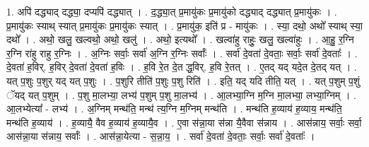 \documentclass[17pt]{extarticle}
\begin{document}
1. अपि॑ दद्ध्याद् दद्ध्या॒ दप्यपि॑ दद्ध्यात् । . द॒द्ध्या॒त् प्र॒मायु॑कः प्र॒मायु॑को दद्ध्याद् दद्ध्यात् प्र॒मायु॑कः । . प्र॒मायु॑कः स्याथ् स्यात् प्र॒मायु॑कः प्र॒मायु॑कः स्यात् । . प्र॒मायु॑क॒ इति॑ प्र - मायु॑कः । . स्या॒ दथो॒ अथो᳚ स्याथ् स्या॒ दथो᳚ । . अथो॒ खलु॒ खल्वथो॒ अथो॒ खलु॑ । . अथो॒ इत्यथो᳚ । . खल्वा॑हु राहुः॒ खलु॒ खल्वा॑हुः । . आ॒हु॒ र॒ग्नि र॒ग्नि रा॑हु राहु र॒ग्निः । . अ॒ग्निः सर्वाः॒ सर्वा॑ अ॒ग्नि र॒ग्निः सर्वाः᳚ । . सर्वा॑ दे॒वता॑ दे॒वताः॒ सर्वाः॒ सर्वा॑ दे॒वताः᳚ । . दे॒वता॑ ह॒विर्. ह॒विर् दे॒वता॑ दे॒वता॑ ह॒विः । . ह॒वि रे॒त दे॒त द्ध॒विर्. ह॒वि रे॒तत् । . ए॒तद् यद् यदे॒त दे॒तद् यत् । . यत् प॒शुः प॒शुर् यद् यत् प॒शुः । . प॒शुरि तीति॑ प॒शुः प॒शु रिति॑ । . इति॒ यद् यदि तीति॒ यत् । . यत् प॒शुम् प॒शुं ॅयद् यत् प॒शुम् । . प॒शु मा॒लभ्या॒ लभ्य॑ प॒शुम् प॒शु मा॒लभ्य॑ । . आ॒लभ्या॒ग्नि म॒ग्नि मा॒लभ्या॒ लभ्या॒ग्निम् । . आ॒लभ्येत्या᳚ - लभ्य॑ । . अ॒ग्निम् मन्थ॑ति॒ मन्थ॑ त्य॒ग्नि म॒ग्निम् मन्थ॑ति । . मन्थ॑ति ह॒व्याय॑ ह॒व्याय॒ मन्थ॑ति॒ मन्थ॑ति ह॒व्याय॑ । . ह॒व्यायै॒ वैव ह॒व्याय॑ ह॒व्यायै॒व । . ए॒वा स॑न्ना॒या स॑न्ना यै॒वैवा स॑न्नाय । . आस॑न्नाय॒ सर्वाः॒ सर्वा॒ आस॑न्ना॒या स॑न्नाय॒ सर्वाः᳚ । . आस॑न्ना॒येत्या - स॒न्ना॒य॒ । . सर्वा॑ दे॒वता॑ दे॒वताः॒ सर्वाः॒ सर्वा॑ दे॒वताः᳚ । \newline
\end{document}
